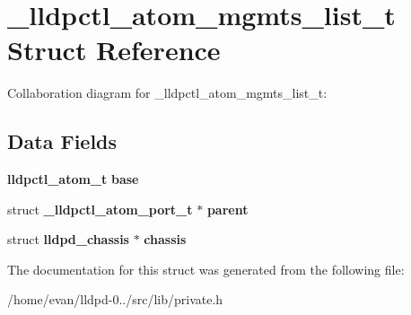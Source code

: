\section{\-\_\-lldpctl\-\_\-atom\-\_\-mgmts\-\_\-list\-\_\-t \-Struct \-Reference}
\label{struct__lldpctl__atom__mgmts__list__t}


\-Collaboration diagram for \-\_\-lldpctl\-\_\-atom\-\_\-mgmts\-\_\-list\-\_\-t\-:
\subsection*{\-Data \-Fields}
\begin{DoxyCompactItemize}
\item 
{\bf lldpctl\-\_\-atom\-\_\-t} {\bfseries base}\label{struct__lldpctl__atom__mgmts__list__t_add397d02e5d3c1626944dc981febfa0f}

\item 
struct {\bf \-\_\-lldpctl\-\_\-atom\-\_\-port\-\_\-t} $\ast$ {\bfseries parent}\label{struct__lldpctl__atom__mgmts__list__t_a6b11064aa792e72fda7db80104928434}

\item 
struct {\bf lldpd\-\_\-chassis} $\ast$ {\bfseries chassis}\label{struct__lldpctl__atom__mgmts__list__t_a7fd421594cbd072428760d611827a2a1}

\end{DoxyCompactItemize}


\-The documentation for this struct was generated from the following file\-:\begin{DoxyCompactItemize}
\item 
/home/evan/lldpd-\/0../src/lib/private.\-h\end{DoxyCompactItemize}
